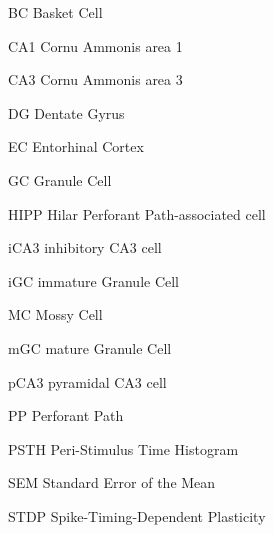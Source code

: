 

\newcommand\Universidade{Federal University of Paraíba}
\newcommand\Departamento{Center for Humanities, Letters and Arts}
\newcommand\Curso{Graduate Program in Cognitive and Behavioral Neuroscience}
\newcommand\mesDefesa{August 2026}
\newcommand\dataDefesa{August 25, 2026}




\pretextual
	



\tableofcontents*
\cleardoublepage

{}
\listoftables*
\cleardoublepage

{}
\listoffigures*
\cleardoublepage

\begin{siglas}
  \item[BC] Basket Cell
  \item[CA1] Cornu Ammonis area 1
  \item[CA3] Cornu Ammonis area 3
  \item[DG] Dentate Gyrus
  \item[EC] Entorhinal Cortex
  \item[GC] Granule Cell
  \item[HIPP] Hilar Perforant Path-associated cell
  \item[iCA3] inhibitory CA3 cell
  \item[iGC] immature Granule Cell
  \item[MC] Mossy Cell
  \item[mGC] mature Granule Cell
  \item[pCA3] pyramidal CA3 cell
  \item[PP] Perforant Path
  \item[PSTH] Peri-Stimulus Time Histogram
  \item[SEM] Standard Error of the Mean
  \item[STDP] Spike-Timing-Dependent Plasticity
\end{siglas}
\cleardoublepage



\textual











\postextual

\printbibliography[title={References}]




